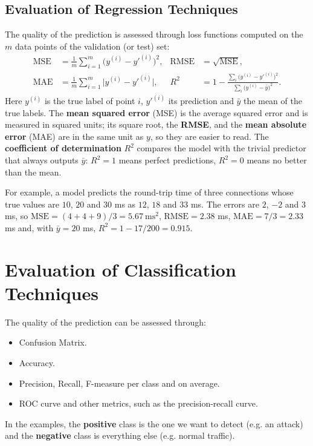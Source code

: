 \subsection{Evaluation of Regression Techniques}

The quality of the prediction is assessed through loss functions computed on the $m$ data points of the validation (or test) set:
\begin{align*}
    \text{MSE} &= \frac{1}{m}\sum_{i=1}^{m} \big(y^{(i)} - {y'}^{(i)}\big)^2, &
    \text{RMSE} &= \sqrt{\text{MSE}}, \\[4pt]
    \text{MAE} &= \frac{1}{m}\sum_{i=1}^{m} \big|y^{(i)} - {y'}^{(i)}\big|, &
    R^2 &= 1 - \frac{\sum_{i}\big(y^{(i)} - {y'}^{(i)}\big)^2}{\sum_{i}\big(y^{(i)} - \bar{y}\big)^2}.
\end{align*}
Here $y^{(i)}$ is the true label of point $i$, ${y'}^{(i)}$ its prediction and $\bar{y}$ the mean of the true labels. The \textbf{mean squared error} (MSE) is the average squared error and is measured in squared units; its square root, the \textbf{RMSE}, and the \textbf{mean absolute error} (MAE) are in the same unit as $y$, so they are easier to read. The \textbf{coefficient of determination} $R^2$ compares the model with the trivial predictor that always outputs $\bar{y}$: $R^2 = 1$ means perfect predictions, $R^2 = 0$ means no better than the mean.

For example, a model predicts the round-trip time of three connections whose true values are $10$, $20$ and $30$ ms as $12$, $18$ and $33$ ms. The errors are $2$, $-2$ and $3$ ms, so $\text{MSE} = (4+4+9)/3 = 5.67\ \text{ms}^2$, $\text{RMSE} = 2.38$ ms, $\text{MAE} = 7/3 = 2.33$ ms and, with $\bar{y} = 20$ ms, $R^2 = 1 - 17/200 = 0.915$.

\section{Evaluation of Classification Techniques}

The quality of the prediction can be assessed through:
\begin{itemize}
    \item Confusion Matrix.
    \item Accuracy.
    \item Precision, Recall, F-measure per class and on average.
    \item ROC curve and other metrics, such as the precision-recall curve.
\end{itemize}
In the examples, the \textbf{positive} class is the one we want to detect (e.g. an attack) and the \textbf{negative} class is everything else (e.g. normal traffic).

